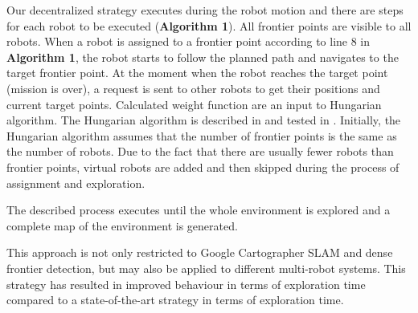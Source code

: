 Our decentralized strategy executes during the robot motion and there are steps for each robot to be executed (\textbf{Algorithm 1}). All frontier points are visible to all robots.
When a robot is assigned to a frontier point according to line 8 in \textbf{Algorithm 1}, the robot starts to follow the planned path and navigates to the target frontier point. At the moment when the robot reaches the target point (mission is over), a request is sent to other robots to get their positions and current target points. Calculated weight function are an input to Hungarian algorithm. 
The Hungarian algorithm is described in \cite{Kuhn1955} and tested in \cite{Kulich2015}. Initially, the Hungarian algorithm assumes that the number of frontier points is the same as the number of robots. Due to the fact that there are usually fewer robots than frontier points, virtual robots are added and then skipped during the process of assignment and exploration. 

The described process executes until the whole environment is explored and a complete  map of the environment is generated.

This approach is not only restricted to Google Cartographer SLAM and dense frontier detection, but may also be applied to different multi-robot systems. This strategy has resulted in improved behaviour in terms of exploration time compared to a state-of-the-art strategy in terms of exploration time. 


